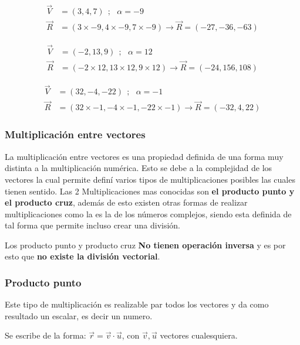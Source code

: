     \begin{align*}
        \vec{V}& =(3,4,7)  \ \ ;\ \ \  \alpha= -9	\\
        \vec{R}&= (3 \times-9,4 \times-9,7 \times-9  )  \rightarrow \vec{R}= (-27,-36,-63 )
    \end{align*}

    \begin{align*}
        \vec{V}& =(-2,13,9)  \ \ ;\ \ \  \alpha = 12 		\\
        \vec{R}&= (-2 \times12, 13 \times12, 9 \times12)  \rightarrow \vec{R}= (-24,156,108)
    \end{align*}

    \begin{align*}
        \vec{V}& =(32,-4,-22)  \ \ ;\ \ \  \alpha = -1		\\
        \vec{R}&= (32 \times-1, -4 \times-1, -22 \times-1 )  \rightarrow \vec{R}= (-32,4,22)
    \end{align*}




    \subsubsection{Multiplicación entre vectores}

    La multiplicación entre vectores es una propiedad definida de una forma
    muy distinta a la multiplicación numérica. Esto se debe a la complejidad de
    los vectores la cual permite definí varios tipos de multiplicaciones posibles
    las cuales tienen sentido. Las 2 Multiplicaciones mas conocidas son \textbf{
    el producto punto y el producto cruz}, además de esto existen otras formas
    de realizar multiplicaciones como la es la de los números complejos, siendo
    esta definida de tal forma que permite incluso crear una división.

    Los producto punto y producto cruz \textbf{No tienen operación inversa} y es
    por esto que \textbf{no existe la división vectorial}.

    \subsubsection{Producto punto}

    Este tipo de multiplicación es realizable par todos los vectores y da como
    resultado un escalar, es decir un numero.

    Se escribe de la forma: $\vec{r} = \vec{v}\cdot\vec{u}$, con
    $\vec{v},\vec{u}$ vectores cualesquiera.

